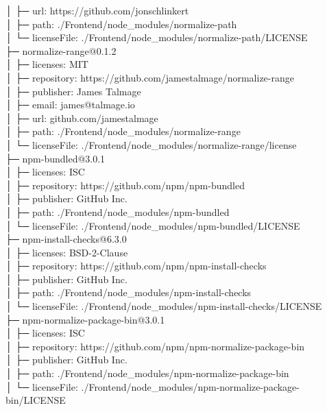 \documentclass[
    paper=a4,
    twoside=false,
    parskip=half,
    listof=entryprefix,
    listof=totoc,
    index=totoc,
    bibliography=totoc,
    headsepline,
]{scrbook}
\begin{document}
    │  ├─ url: https://github.com/jonschlinkert\\
    │  ├─ path: ./Frontend/node\_modules/normalize-path\\
    │  └─ licenseFile: ./Frontend/node\_modules/normalize-path/LICENSE\\
    ├─ normalize-range@0.1.2\\
    │  ├─ licenses: MIT\\
    │  ├─ repository: https://github.com/jamestalmage/normalize-range\\
    │  ├─ publisher: James Talmage\\
    │  ├─ email: james@talmage.io\\
    │  ├─ url: github.com/jamestalmage\\
    │  ├─ path: ./Frontend/node\_modules/normalize-range\\
    │  └─ licenseFile: ./Frontend/node\_modules/normalize-range/license\\
    ├─ npm-bundled@3.0.1\\
    │  ├─ licenses: ISC\\
    │  ├─ repository: https://github.com/npm/npm-bundled\\
    │  ├─ publisher: GitHub Inc.\\
    │  ├─ path: ./Frontend/node\_modules/npm-bundled\\
    │  └─ licenseFile: ./Frontend/node\_modules/npm-bundled/LICENSE\\
    ├─ npm-install-checks@6.3.0\\
    │  ├─ licenses: BSD-2-Clause\\
    │  ├─ repository: https://github.com/npm/npm-install-checks\\
    │  ├─ publisher: GitHub Inc.\\
    │  ├─ path: ./Frontend/node\_modules/npm-install-checks\\
    │  └─ licenseFile: ./Frontend/node\_modules/npm-install-checks/LICENSE\\
    ├─ npm-normalize-package-bin@3.0.1\\
    │  ├─ licenses: ISC\\
    │  ├─ repository: https://github.com/npm/npm-normalize-package-bin\\
    │  ├─ publisher: GitHub Inc.\\
    │  ├─ path: ./Frontend/node\_modules/npm-normalize-package-bin\\
    │  └─ licenseFile: ./Frontend/node\_modules/npm-normalize-package-bin/LICENSE\\
\end{document}
